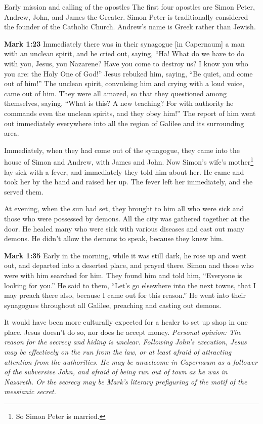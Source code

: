 \documentclass[10pt,twoside]{book}
\newcommand{\quotesize}{\normalsize{}}
\newcommand{\comm}[1]{\begingroup \color{black!50} #1\endgroup}
\newenvironment{quotetext}{\begingroup\quotesize}{\endgroup}
\newcommand{\bible}[2]{\begin{quotetext}\textbf{#1} #2\end{quotetext}}
\newcommand{\gospelmark}[2]{\bible{Mark #1}{#2}}
\newcommand{\personal}[1]{\emph{Personal opinion:\/ #1}}
\begin{document}
\begin{section}{Early mission and calling of the apostles}
{The first four apostles are Simon Peter, Andrew, John, and James the Greater. Simon Peter
is traditionally considered the founder of the Catholic Church. Andrew's name is Greek rather than Jewish.
}

\gospelmark{1:23}{Immediately there was in their synagogue [in Capernaum] a man with an unclean spirit, and he cried out,   saying, ``Ha! What do we have to do with you, Jesus, you Nazarene? Have you come to destroy us? I know you who you are: the Holy One of God!''
  Jesus rebuked him, saying, ``Be quiet, and come out of him!''
  The unclean spirit, convulsing him and crying with a loud voice, came out of him.   They were all amazed, so that they questioned among themselves, saying, ``What is this? A new teaching? For with authority he commands even the unclean spirits, and they obey him!''   The report of him went out immediately everywhere into all the region of Galilee and its surrounding area.

  Immediately, when they had come out of the synagogue, they came into the house of Simon and Andrew, with James and John.
   Now Simon's wife's mother\footnote{So Simon Peter is married.} lay sick with a fever, and immediately they told him about her.   He came and took her by the hand and raised her up. The fever left her immediately, and she served them.

  At evening, when the sun had set, they brought to him all who were sick and those who were possessed by demons.   All the city was gathered together at the door.   He healed many who were sick with various diseases and cast out many demons. He didn't allow the demons to speak, because they knew him.}

\gospelmark{1:35}{Early in the morning, while it was still dark, he rose up and went out, and departed into a deserted place, and prayed there.   Simon and those who were with him searched for him.   They found him and told him, ``Everyone is looking for you.''
  He said to them, ``Let's go elsewhere into the next towns, that I may preach there also, because I came out for this reason.''   He went into their synagogues throughout all Galilee, preaching and casting out demons.}

\comm{
It would have been more culturally expected for a healer to set up shop in one place. Jesus doesn't do so, nor does
he accept money. \personal{The reason for the secrecy and hiding is unclear. Following John's execution, Jesus may be
effectively on the run from the law, or at least afraid of attracting attention from the authorities. He may be unwelcome
in Capernaum as a follower of the subversive John, and afraid of being run out of town as he was in Nazareth. Or the secrecy
may be Mark's literary prefiguring of the motif of the messianic secret.}
}


\end{section}
\end{document}
